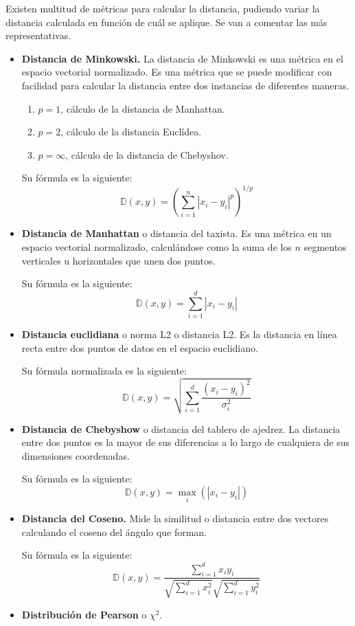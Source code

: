 Existen multitud de métricas para calcular la distancia, pudiendo variar la distancia calculada en función de cuál se aplique. Se van a comentar las más representativas.
\begin{itemize}
\item \textbf{Distancia de Minkowski.} La distancia de Minkowski es una métrica en el espacio vectorial normalizado. Es una métrica que se puede modificar con facilidad para calcular la distancia entre dos instancias de diferentes maneras. 
\begin{enumerate}
\item \(p = 1\), cálculo de la distancia de Manhattan.
\item \(p = 2\), cálculo de la distancia Euclídea.
\item \(p = \infty\), cálculo de la distancia de Chebyshov.
\end{enumerate}
Su fórmula es la siguiente:
\[ \mathbb{D}(x, y) = \left( \sum_{i=1}^{n}\left| x_i - y_i \right|^p \right)^{1/p} \]

\item \textbf{Distancia de Manhattan} o distancia del taxista. Es una métrica en un espacio vectorial normalizado, calculándose como la suma de los $n$ segmentos verticales u horizontales que unen dos puntos.

Su fórmula es la siguiente:
\[  \mathbb{D}(x, y) = \sum_{i=1}^{d}\left| x_i - y_i\right| \]

\item \textbf{Distancia euclidiana} o norma L2 o distancia L2. Es la distancia en línea recta entre dos puntos de datos en el espacio euclidiano.

Su fórmula normalizada es la siguiente:
\[  \mathbb{D}(x, y) = \sqrt{\sum_{i=1}^{d} \frac{\left(x_i - y_i\right)^2}{\sigma_i^2}}  \]

\item \textbf{Distancia de Chebyshow} o distancia del tablero de ajedrez. La distancia entre dos puntos es la mayor de sus diferencias a lo largo de cualquiera de sus dimensiones coordenadas.

Su fórmula es la siguiente:
\[  \mathbb{D}(x, y) = \max_i\left(\left|x_i - y_i\right|\right) \]

\item \textbf{Distancia del Coseno.} Mide la similitud o distancia entre dos vectores calculando el coseno del ángulo que forman.

Su fórmula es la siguiente:
\[ \mathbb{D}(x, y) = \frac{\sum_{i=1}^{d}x_iy_i}{\sqrt{\sum_{i=1}^{d}x_i^2}\sqrt{\sum_{i=1}^{d}y_i^2} } \]

\item \textbf{Distribución de Pearson} o $\chi^2$. 

\end{itemize}
\newpage
